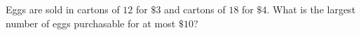 Eggs are sold in cartons of $12$ for $\$3$ and cartons of $18$ for $\$4$. What is the largest number of eggs purchasable for at most $\$10$?
